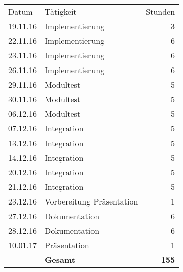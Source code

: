\begin{minipage}{0.5\textwidth}
    \begin{tabular}{llr}
       Datum& Tätigkeit&Stunden\\
       19.11.16&Implementierung&3 \\
       22.11.16&Implementierung&6 \\
       23.11.16&Implementierung&6 \\
       26.11.16&Implementierung&6 \\
       29.11.16&Modultest&5 \\
       30.11.16&Modultest&5 \\
       06.12.16&Modultest&5 \\
       07.12.16&Integration&5 \\
       13.12.16&Integration&5 \\
       14.12.16&Integration&5 \\      
       20.12.16&Integration&5 \\
       21.12.16&Integration&5 \\
       23.12.16&Vorbereitung Präsentation&1 \\
       27.12.16&Dokumentation&6 \\
       28.12.16&Dokumentation&6 \\
       10.01.17&Präsentation&1 \\
       &\textbf{Gesamt}&\textbf{155}
    \end{tabular}
\end{minipage}
